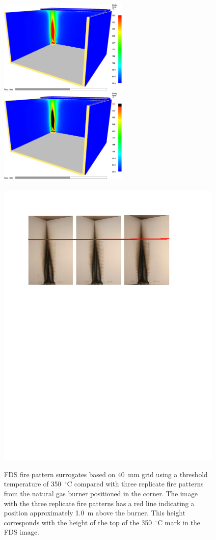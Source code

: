 \documentclass[twoside]{uocthesis}
\begin{document}
\begin{figure}[h]
  \centering
  \includegraphics[width=2.5in]{../Figures/10}
  \includegraphics[width=2.5in]{../Figures/11}\\
  \hspace{4 mm}  \\ 
  \includegraphics[width=.8\columnwidth]{../Figures/NGCorner_guideline}\\
  \caption[FDS fire pattern surrogates based on 40~mm grid using a threshold temperature of 350~$^\circ$C compared with three replicate fire patterns from the natural gas burner positioned in the corner]{FDS fire pattern surrogates based on 40~mm grid using a threshold temperature of 350~$^\circ$C compared with three replicate fire patterns from the natural gas burner positioned in the corner.  The image with the three replicate fire patterns has a red line indicating a position approximately 1.0~m above the burner.  This height corresponds with the height of the top of the 350~$^\circ$C mark in the FDS image.}





\end{figure}
\end{document}
